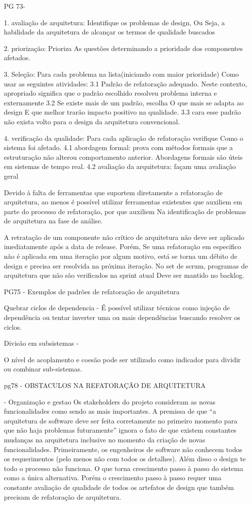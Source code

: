 PG 73- 

1. avaliação de arquitetura:
Identifique os problemas de design, Ou Seja, a habilidade da arquitetura de alcançar os termos de qualidade buscados

2. priorização:
Prioriza As questões determinando a prioridade dos componentes afetados.

3. Seleção:
Para cada problema na lista(iniciando com maior prioridade) Como usar as seguintes atividades:
	3.1 Padrão de refatoração adequado. Neste contexto, apropriado significa que o padrão escolhido resolveu problema interna e externamente
	3.2 Se existe mais de um padrão, escolha O que mais se adapta ao design E que melhor trarão impacto positivo na qualidade.
	3.3 cara esse padrão não exista volto para o design da arquitetura convencional.

4. verificação da qualidade: 
	Para cada aplicação de refatoração verifique Como o sistema foi afetado.
	4.1 abordagem formal: prova com métodos formais que a estruturação não alterou comportamento anterior. Abordagens formais são úteis em sistemas de tempo real.
	4.2 avaliação da arquitetura: façam uma avaliação geral
	

Devido à falta de ferramentas que suportem diretamente a refatoração de arquitetura, ao menos é possível utilizar ferramentas existentes que  auxiliem em parte do processo de refatoração, por que auxiliem Na identificação de problemas de arquitetura na fase de análise.

A retratação de um componente não crítico de arquitetura não deve ser aplicado imediatamente após a data de release. Porém, Se uma refatoração em especifico não é aplicada em uma iteração por algum motivo, está se torna um débito de design e precisa ser resolvida na próxima iteração. No set de scrum, programas de arquitetura que não são verificados na sprint atual Deve ser mantido no backlog.


PG75 - 	Exemplos de padrões de refatoração de arquitetura

Quebrar ciclos de dependencia - 
É possível utilizar técnicas como injeção de dependência ou tentar inverter uma ou mais dependências buscando resolver os ciclos.

Divisão em subsistemas - 

O nível de acoplamento e coesão pode ser utilizado como indicador para dividir ou combinar sub-sistemas.

pg78 - OBSTACULOS NA REFATORAÇÃO DE ARQUITETURA

- Organização e gestao 
Os stakeholders do projeto consideram as novas funcionalidades como sendo as mais importantes.
A premissa de que “a arquitetura de software deve ser feita corretamente no primeiro momento para que não haja problemas futuramente” ignora o fato de que existem constantes mudanças na arquitetura inclusive no momento da criação de novas funcionalidades.
Primeiramente, os engenheiros de software não conhecem todos os requerimentos (pelo menos não com todos os detalhes). 
Além disso o design te todo o processo não funciona. O que torna crescimento passo à passo do sistema como a única alternativa.
Porém o crescimento passo à passo requer uma constante avaliação de qualidade de todos os artefatos de design que também precisam de refatoração de arquitetura.

